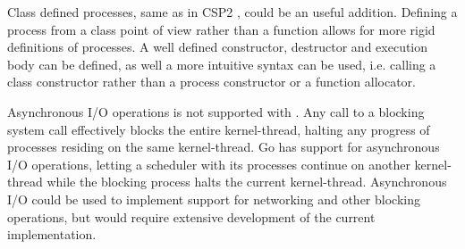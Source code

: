 Class defined processes, same as in \Cpp{}CSP2 \citep{brown2007c++csp2}, could be an useful addition. Defining a process from a class point of view rather than a function allows for more rigid definitions of processes. A well defined constructor, destructor and execution body can be defined, as well a more intuitive syntax can be used, i.e. calling a class constructor rather than a process constructor or a function allocator.

Asynchronous I/O operations is not supported with \Proxc{}. Any call to a blocking system call effectively blocks the entire kernel\hyp{}thread, halting any progress of processes residing on the same kernel\hyp{}thread. Go has support for asynchronous I/O operations, letting a scheduler with its processes continue on another kernel\hyp{}thread while the blocking process halts the current kernel\hyp{}thread. Asynchronous I/O could be used to implement support for networking and other blocking operations, but would require extensive development of the current implementation.

